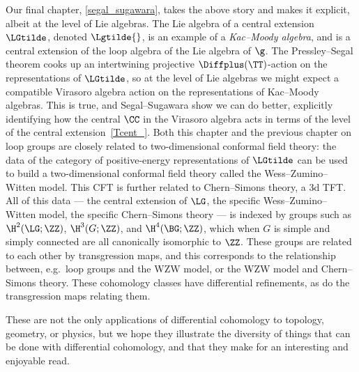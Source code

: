 Our final chapter, \cref{segal_sugawara}, takes the above story and makes it explicit, albeit at the level of Lie
algebras. The Lie algebra of a central extension $\LGtilde$, denoted $\Lgtilde{}$, is an example of a
\emph{Kac--Moody algebra}, and is a central extension of the loop algebra of the Lie algebra of $\g$. The
Pressley--Segal theorem cooks up an intertwining projective $\Diffplus(\TT)$-action on the representations of
$\LGtilde$, so at the level of Lie algebras we might expect a compatible Virasoro algebra action on the
representations of Kac--Moody algebras. This is true, and Segal--Sugawara show we can do better, explicitly
identifying how the central $\CC$ in the Virasoro algebra acts in terms of the level of the central
extension~\eqref{Tcent_}. Both this chapter and the previous chapter on loop groups are closely related to
two-dimensional conformal field theory: the data of the category of positive-energy representations of $\LGtilde$
can be used to build a two-dimensional conformal field theory called the Wess--Zumino--Witten model. This CFT is
further related to Chern--Simons theory, a 3d TFT. All of this data --- the central extension of $\LG$, the
specific Wess--Zumino--Witten model, the specific Chern--Simons theory --- is indexed by groups such as
$\H^2(\LG;\ZZ)$, $\H^3(G;\ZZ)$, and $\H^4(\BG;\ZZ)$, which when $G$ is simple and simply connected are all
canonically isomorphic to $\ZZ$. These groups are related to each other by transgression maps, and this corresponds
to the relationship between, e.g.\ loop groups and the WZW model, or the WZW model and Chern--Simons theory. These
cohomology classes have differential refinements, as do the transgression maps relating them.

These are not the only applications of differential cohomology to topology, geometry, or physics, but we hope they
illustrate the diversity of things that can be done with differential cohomology, and that they make for an
interesting and enjoyable read.

